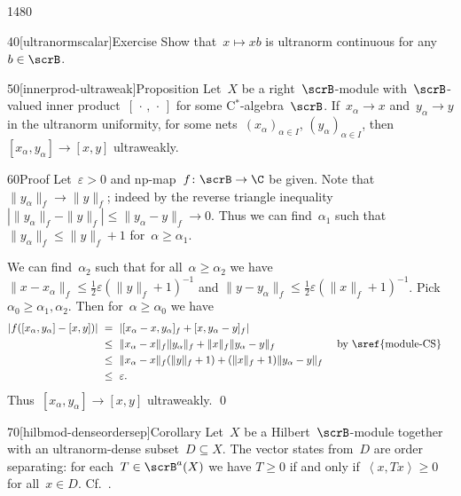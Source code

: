 \begin{parsec}{1480}
\begin{point}{40}[ultranormscalar]{Exercise}
Show that~$x \mapsto xb$
    is ultranorm continuous for any~$b \in \scrB$.
\end{point}
\begin{point}{50}[innerprod-ultraweak]{Proposition}%
Let~$X$ be a right~$\scrB$-module
    with~$\scrB$-valued inner product~$[\,\cdot\,,\,\cdot\,]$
    for some C$^*$-algebra~$\scrB$.
If~$x_\alpha \to x$ and~$y_\alpha \to y$
    in the ultranorm uniformity,
    for some nets~$(x_\alpha)_{\alpha\in I}$, $(y_\alpha)_{\alpha \in I}$,
    then~$[x_\alpha,y_\alpha] \to [x,y]$ ultraweakly.
\begin{point}{60}{Proof}%
Let~$\varepsilon > 0$ and np-map~$f\colon \scrB \to \C$ be given.
Note that~$\|y_\alpha\|_f \to \|y\|_f$;
    indeed by the reverse triangle inequality 
    $|\|y_\alpha\|_f - \|y\|_f| \leq \| y_\alpha - y\|_f \to 0$.
Thus we can find~$\alpha_1$ such that~$\|y_\alpha\|_f \leq \|y\|_f + 1$
    for~$\alpha \geq \alpha_1$.

We can find~$\alpha_2$
    such that for all~$\alpha \geq \alpha_2$
    we have $\|x-x_\alpha\|_f \leq \frac{1}{2}\varepsilon (\|y\|_f + 1)^{-1}$
    and
    $\|y-y_\alpha\|_f \leq \frac{1}{2}\varepsilon (\|x\|_f + 1)^{-1}$.
Pick~$\alpha_0 \geq \alpha_1,\alpha_2$.
Then for~$\alpha \geq \alpha_0$ we have
\begin{align*}
    |f([x_\alpha,y_\alpha] - [x,y])| 
    & \ = \ |[x_\alpha - x, y_\alpha]_f + [x,y_\alpha - y]_f| \\
    & \ \leq \ 
         \|x_\alpha - x\|_f \| y_\alpha\|_f + \|x\|_f\|y_\alpha - y\|_f
                && \text{ by \sref{module-CS}}\\
    & \ \leq \ 
         \|x_\alpha - x\|_f (\|y\|_f+1) + (\|x\|_f+1)\|y_\alpha - y\|_f \\
    & \ \leq \ 
         \varepsilon.
\end{align*}
Thus~$[x_\alpha,y_\alpha] \to [x,y]$ ultraweakly. \qed
\end{point}
\end{point}
\begin{point}{70}[hilbmod-denseordersep]{Corollary}%
Let~$X$ be a Hilbert~$\scrB$-module
    together with an ultranorm-dense subset~$D \subseteq X$.
The vector states from~$D$ are order separating:
for each~$T \in \scrB^a(X)$ we have
$T \geq 0$ if and only if~$\left<x,Tx\right> \geq 0$
    for all~$x \in D$.  Cf.~.
\end{point}
\end{parsec}


